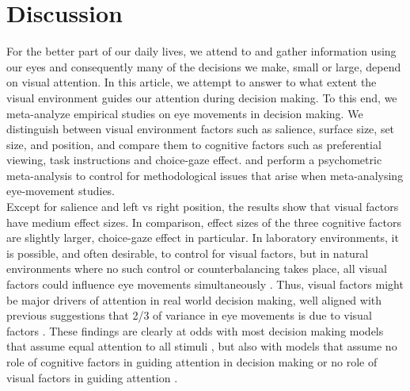 
\section{Discussion}

For the better part of our daily lives, we attend to and gather information using our eyes and consequently many of the decisions we make, small or large, depend on visual attention. In this article, we attempt to answer to what extent the visual environment guides our attention during decision making. To this end, we meta-analyze empirical studies on eye movements in decision making. We distinguish between visual environment factors such as salience, surface size, set size, and position, and compare them to cognitive factors such as preferential viewing, task instructions and choice-gaze effect.  and perform a psychometric meta-analysis to control for methodological issues that arise when meta-analysing eye-movement studies.\\ 

Except for salience and left vs right position, the results show that visual factors have medium effect sizes. In comparison, effect sizes of the three cognitive factors are slightly larger, choice-gaze effect in particular.  In laboratory environments, it is possible, and often desirable, to control for visual factors, but in natural environments where no such control or counterbalancing takes place, all visual factors could influence eye movements simultaneously \citep{gidloef2017a, orquin2019a}.  Thus, visual factors might be major drivers of attention in real world decision making, well aligned with previous suggestions that 2/3 of variance in eye movements is due to visual factors \citep{vanderlans2008}. These findings are clearly at odds with most decision making models that assume equal attention to all stimuli \citep{tversky1979,payne1988, simon1956a}, but also with models that assume no role of cognitive factors in guiding attention in decision making \citep{busemeyer1992, krajbich2010a} or no role of visual factors in guiding attention \citep{callaway2019a, gloeckner2011a, gluth2018, gluth2020}.\\ 

